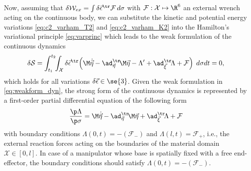 \noindent Now, assuming that $\delta \mathcal{W}_{ex} = \int \delta \vec{\epsilon}^\tr \mathcal{F} \, d \sigma $ with $\mathcal{F}: \mathcal{X} \mapsto \R^6$ an external wrench acting on the continuous body, we can substitute the kinetic and potential energy variations \eqref{eq:c2_varham_T2} and \eqref{eq:c2_varham_K2} into the Hamilton's variational principle \eqref{eq:varprinc} which leads to the weak formulation of the continuous dynamics
\begin{equation}
\delta\mathcal{S} = \int_{t_1}^{t_2} \!\! \int_\mathcal{X} \delta \vec{\epsilon}^\tr \!\left(  \M\dot{\vec{\eta}} - \ad_{\vec{\eta}}^\tr \! \M \vec{\eta} - \Lambda' + \ad_{\vec{\xi}}^\tr \! \Lambda + \mathcal{F}\right)\;d\sigma dt = 0, \label{eq:weakform_dyn}
\end{equation}
which holds for all variations $\delta \vec{\epsilon} \in  \se{3}$. Given the weak formulation in \eqref{eq:weakform_dyn}, the strong form of the continuous dynamics is represented by a first-order partial differential equation of the following form
\begin{equation}
 \dfrac{\p \Lambda}{\p \sigma} = \M \dot{\vec{\eta}} - \ad_{\vec{\eta}}^\tr \! \M \vec{\eta}  + \ad_{\vec{\xi}}^\tr \! \Lambda + \mathcal{F} \label{eq:cont_dyn_pde}
\end{equation}
with boundary conditions $\Lambda(0,t) = -(\mathcal{F}_{-})$ and $\Lambda(l,t) = \mathcal{F}_{+}$, i.e., the external reaction forces acting on the boundaries of the material domain $\mathcal{X} \in [0,l]$. In case of a manipulator whose base is spatially fixed with a free end-effector, the boundary conditions should satisfy $\Lambda(0,t) = -(\mathcal{F}_{-})$.


